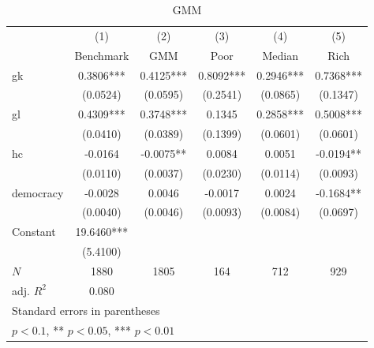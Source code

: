 \begin{table}[htbp]\centering
\def\sym#1{\ifmmode^{#1}\else\(^{#1}\)\fi}
\caption{GMM \label{tab:GMM}}
\begin{tabular}{l*{5}{c}}
\hline\hline
            &\multicolumn{1}{c}{(1)}&\multicolumn{1}{c}{(2)}&\multicolumn{1}{c}{(3)}&\multicolumn{1}{c}{(4)}&\multicolumn{1}{c}{(5)}\\
            &\multicolumn{1}{c}{Benchmark}&\multicolumn{1}{c}{GMM}&\multicolumn{1}{c}{Poor}&\multicolumn{1}{c}{Median}&\multicolumn{1}{c}{Rich}\\
\hline
gk          &      0.3806***&      0.4125***&      0.8092***&      0.2946***&      0.7368***\\
            &    (0.0524)   &    (0.0595)   &    (0.2541)   &    (0.0865)   &    (0.1347)   \\
[1em]
gl          &      0.4309***&      0.3748***&      0.1345   &      0.2858***&      0.5008***\\
            &    (0.0410)   &    (0.0389)   &    (0.1399)   &    (0.0601)   &    (0.0601)   \\
[1em]
hc          &     -0.0164   &     -0.0075** &      0.0084   &      0.0051   &     -0.0194** \\
            &    (0.0110)   &    (0.0037)   &    (0.0230)   &    (0.0114)   &    (0.0093)   \\
[1em]
democracy   &     -0.0028   &      0.0046   &     -0.0017   &      0.0024   &     -0.1684** \\
            &    (0.0040)   &    (0.0046)   &    (0.0093)   &    (0.0084)   &    (0.0697)   \\
[1em]
Constant    &     19.6460***&               &               &               &               \\
            &    (5.4100)   &               &               &               &               \\
\hline
\(N\)       &        1880   &        1805   &         164   &         712   &         929   \\
adj. \(R^{2}\)&       0.080   &               &               &               &               \\
\hline\hline
\multicolumn{6}{l}{\footnotesize Standard errors in parentheses}\\
\multicolumn{6}{l}{\footnotesize * \(p<0.1\), ** \(p<0.05\), *** \(p<0.01\)}\\
\end{tabular}
\end{table}
